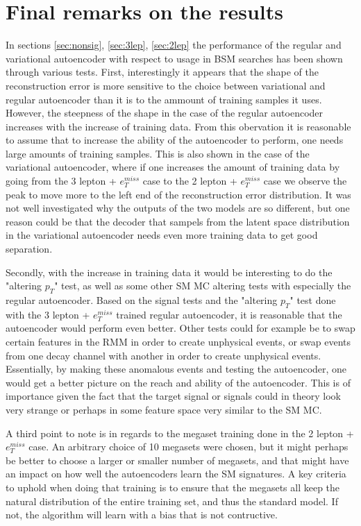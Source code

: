 \section{Final remarks on the results}
In sections \ref{sec:nonsig}, \ref{sec:3lep}, \ref{sec:2lep} the performance 
of the regular and variational autoencoder with respect to usage in BSM 
searches has been shown through various tests. First, interestingly it appears that 
the shape of the reconstruction error is more sensitive to the choice between 
variational and regular autoencoder than it is to the ammount of training samples 
it uses. However, the steepness of the shape in the case of the regular autoencoder 
increases with the increase of training data. From this obervation it is reasonable 
to assume that to increase the ability of the autoencoder to perform, one needs 
large amounts of training samples. This is also shown in the case of the variational 
autoencoder, where if one increases the amount of training data by going from the 
3 lepton + $e_T^{miss}$ case to the 2 lepton + $e_T^{miss}$ case we observe the 
peak to move more to the left end of the reconstruction error distribution. It was not 
well investigated why the outputs of the two models are so different, but one reason 
could be that the decoder that sampels from the latent space distribution in the 
variational autoencoder needs even more training data to get good separation. \par 
Secondly, with the increase in training data it would be interesting to do the 
"altering $p_T$" test, as well as some other SM MC altering tests with especially the 
regular autoencoder. Based on the signal tests and the "altering $p_T$" test done with 
the 3 lepton + $e_T^{miss}$ trained regular autoencoder, it is reasonable that the 
autoencoder would perform even better. Other tests could for example be to swap 
certain features in the RMM in order to create unphysical events, or swap events from
one decay channel with another in order to create unphysical events. Essentially, 
by making these anomalous events and testing the autoencoder, one would get a better 
picture on the reach and ability of the autoencoder. This is of importance given the 
fact that the target signal or signals could in theory look very strange or perhaps 
in some feature space very similar to the SM MC. \par 
A third point to note is in regards to the megaset training done in the 2 lepton + 
$e_T^{miss}$ case. An arbitrary choice of 10 megasets were chosen, but it might perhaps 
be better to choose a larger or smaller number of megasets, and that might have an impact
on how well the autoencoders learn the SM signatures. A key criteria to uphold when 
doing that training is to ensure that the megasets all keep the natural distribution of 
the entire training set, and thus the standard model. If not, the algorithm will learn
with a bias that is not contructive. 